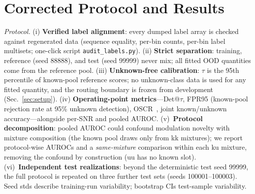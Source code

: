 \documentclass[journal,letterpaper]{IEEEtran}
\begin{document}
\section{Corrected Protocol and Results}
\label{sec:corrected}

\emph{Protocol.} (i) \textbf{Verified label alignment}: every dumped
label array is checked against regenerated data (sequence equality,
per-bin counts, per-bin label multisets; one-click script
\texttt{audit\_labels.py}). (ii) \textbf{Strict
separation}: training, reference (seed 88888), and test (seed 99999)
never mix; all fitted OOD quantities come from the reference pool. (iii) \textbf{Unknown-free calibration}: $\tau$ is the
95th percentile of known-pool reference scores; no unknown-class data
is used for any fitted quantity, and the routing boundary is frozen
from development (Sec.~\ref{sec:setup}). (iv) \textbf{Operating-point metrics}---Det@$\tau$, FPR95
(known-pool rejection rate at 95\% unknown detection),
OSCR~\cite{dhamija2018oscr}, joint known/unknown
accuracy---alongside per-SNR and pooled AUROC\@. (v)~\textbf{Protocol
decomposition}: pooled AUROC could confound modulation novelty with
mixture composition (the known pool draws only from kk mixtures); we
report protocol-wise AUROCs and a \emph{same-mixture} comparison within
each ku mixture, removing the confound by construction (uu has no
known slot). (vi)~\textbf{Independent test
realizations}: beyond the deterministic test seed 99999, the full
protocol is repeated on three further test sets (seeds
100001--100003). Seed stds describe training-run variability; bootstrap
CIs test-sample variability.
\end{document}
